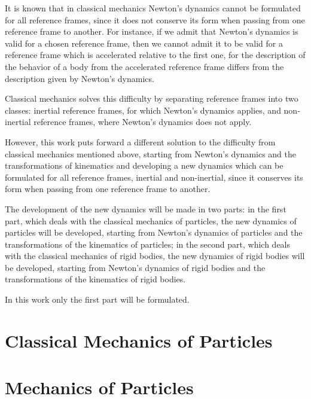 \documentclass[12pt]{article}
\begin{document}
\par It is known that in classical mechanics Newton's dynamics cannot be formulated for all reference frames, since it does not conserve its form when passing from one reference frame to another. For instance, if we admit that Newton's dynamics is valid for a chosen reference frame, then we cannot admit it to be valid for a reference frame which is accelerated relative to the first one, for the description of the behavior of a body from the accelerated reference frame differs from the description given by Newton's dynamics.
\medskip
\par Classical mechanics solves this difficulty by separating reference frames into two classes: inertial reference frames, for which Newton's dynamics applies, and non-inertial reference frames, where Newton's dynamics does not apply.
\medskip
\par However, this work puts forward a different solution to the difficulty from classical mechanics mentioned above, starting from Newton's dynamics and the transformations of kinematics and developing a new dynamics which can be formulated for all reference frames, inertial and non-inertial, since it conserves its form when passing from one reference frame to another.
\medskip
\par The development of the new dynamics will be made in two parts: in the first part, which deals with the classical mechanics of particles, the new dynamics of particles will be developed, starting from Newton's dynamics of particles and the transformations of the kinematics of particles; in the second part, which deals with the classical mechanics of rigid bodies, the new dynamics of rigid bodies will be developed, starting from \hbox {Newton's} dynamics of rigid bodies and the transformations of the kinematics of rigid bodies.
\medskip
\par In this work only the first part will be formulated.

\newpage

{\centering\section*{Classical Mechanics of Particles}}

{\centering\tableofcontents}

{\centering\section{Mechanics of Particles}}
\end{document}
